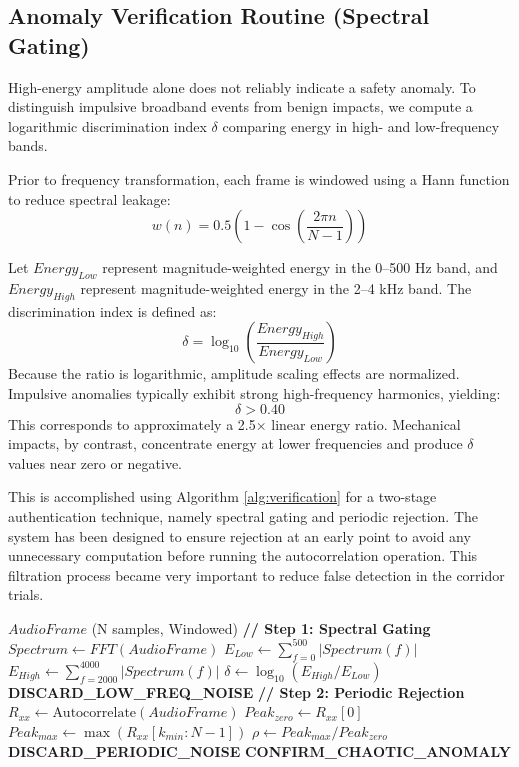 \documentclass[conference]{IEEEtran}
\begin{document}
\subsection{Anomaly Verification Routine (Spectral Gating)}
High-energy amplitude alone does not reliably indicate a safety anomaly. To distinguish impulsive broadband events from benign impacts, we compute a logarithmic discrimination index $\delta$ comparing energy in high- and low-frequency bands.



Prior to frequency transformation, each frame is windowed using a Hann function to reduce spectral leakage:
\begin{equation}
w(n) = 0.5 \left( 1 - \cos\left(\frac{2\pi n}{N-1}\right) \right)
\end{equation}

Let $Energy_{Low}$ represent magnitude-weighted energy in the 0–500 Hz band, and $Energy_{High}$ represent magnitude-weighted energy in the 2–4 kHz band. The discrimination index is defined as:
\begin{equation}
\delta = \log_{10}\left(\frac{Energy_{High}}{Energy_{Low}}\right)
\end{equation}
Because the ratio is logarithmic, amplitude scaling effects are normalized. Impulsive anomalies typically exhibit strong high-frequency harmonics, yielding:
\begin{equation}
\delta > 0.40
\end{equation}
This corresponds to approximately a 2.5× linear energy ratio. Mechanical impacts, by contrast, concentrate energy at lower frequencies and produce $\delta$ values near zero or negative.

This is accomplished using Algorithm \ref{alg:verification} for a two-stage authentication technique, namely spectral gating and periodic rejection. The system has been designed to ensure rejection at an early point to avoid any unnecessary computation before running the autocorrelation operation. This filtration process became very important to reduce false detection in the corridor trials.

\begin{algorithm}
\caption{Anomaly Verification Routine}
\begin{algorithmic}[1]
\REQUIRE $AudioFrame$ (N samples, Windowed)
\STATE \textbf{// Step 1: Spectral Gating}
\STATE $Spectrum \gets FFT(AudioFrame)$
\STATE $E_{Low} \gets \sum_{f=0}^{500} |Spectrum(f)|$ 
\STATE $E_{High} \gets \sum_{f=2000}^{4000} |Spectrum(f)|$ 
\STATE $\delta \gets \log_{10}(E_{High} / E_{Low})$
    \STATE \textbf{DISCARD\_LOW\_FREQ\_NOISE}
    \RETURN
\ENDIF
\STATE \textbf{// Step 2: Periodic Rejection}
\STATE $R_{xx} \gets \text{Autocorrelate}(AudioFrame)$
\STATE $Peak_{zero} \gets R_{xx}[0]$
\STATE $Peak_{max} \gets \max(R_{xx}[k_{min}:N-1])$
\STATE $\rho \gets Peak_{max} / Peak_{zero}$
    \STATE \textbf{DISCARD\_PERIODIC\_NOISE}
\ELSE
    \STATE \textbf{CONFIRM\_CHAOTIC\_ANOMALY}
\ENDIF
\end{algorithmic}
\label{alg:verification}
\end{algorithm}
\end{document}

